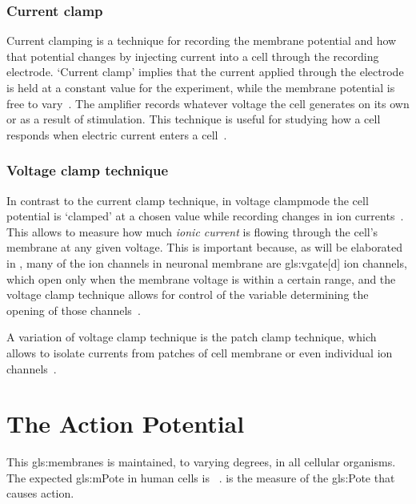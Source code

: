 \documentclass[class={myRUCProject}, crop=false]{standalone}
\begin{document}
\subsubsection{Current clamp}\label{sec:Cclamp}

Current clamping is a technique for recording the membrane potential and how that potential changes by injecting current into a cell through the recording electrode.  
`Current clamp' implies that the current applied through the electrode is held at a constant value for the experiment, while the membrane potential is free to vary~\cite{Hammond2015ch4}. The amplifier records whatever voltage the cell generates on its own or as a result of stimulation. 
This technique is useful for studying how a cell responds when electric current enters a cell~\cite{Hammond2015ch4}.

\subsubsection{Voltage clamp technique}\label{sec:Vclamp} 
 
In contrast to the current clamp technique, in voltage clampmode the cell potential is `clamped' at a chosen value while recording changes in ion currents~\cite{Hammond2015ch4}. 
This allows to measure how much \textit{ionic current} is flowing through the cell's membrane at any given voltage. 
This is important because, as will be elaborated in , many of the ion channels in neuronal membrane are \gls{gls:vgate}[d] ion channels, which open only when the membrane voltage is within a certain range, and the voltage clamp technique allows for control of the variable determining the opening of those channels~\cite{Hammond2015ch4}.

A variation of  voltage clamp technique is the patch clamp technique, which allows to isolate currents from patches of cell membrane or even individual ion channels~\cite{Hammond2015ch4}.%

\section{The Action Potential}\label{sec:ap}
This \glspl{gls:membrane} is maintained, to varying degrees, in all cellular organisms. 
The expected \gls{gls:mPote} in human cells is ~\cite{Hammond2015ch4}.
 is the measure of the \gls{gls:Pote} that causes action.
\end{document}
